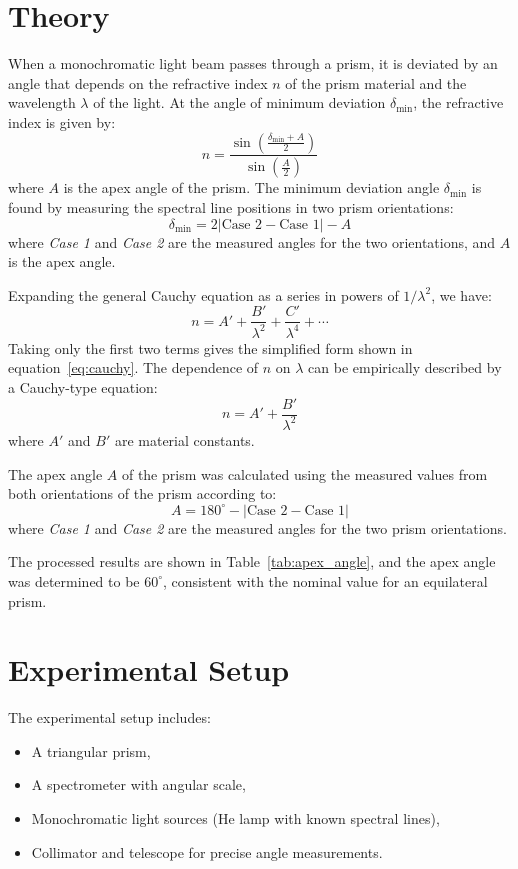 \documentclass[journal]{IEEEtran}
\begin{document}
\section*{Theory}
When a monochromatic light beam passes through a prism, it is deviated by an angle that depends on the refractive index \( n \) of the prism material and the wavelength \( \lambda \) of the light. At the angle of minimum deviation \( \delta_{\min} \), the refractive index is given by:
\begin{equation}
n = \frac{\sin\left(\frac{\delta_{\min} + A}{2}\right)}{\sin\left(\frac{A}{2}\right)}
\label{eq:refractive_index}
\end{equation}
where \( A \) is the apex angle of the prism.
The minimum deviation angle \( \delta_{\min} \) is found by measuring the spectral line positions in two prism orientations:
\begin{equation}
\delta_{\min} = 2 \left| \text{Case 2} - \text{Case 1} \right| - A
\end{equation}
where \textit{Case 1} and \textit{Case 2} are the measured angles for the two orientations, and \( A \) is the apex angle. 

Expanding the general Cauchy equation as a series in powers of \( 1/\lambda^2 \), we have:
\begin{equation}
n = A' + \frac{B'}{\lambda^2} + \frac{C'}{\lambda^4} + \cdots
\end{equation}
Taking only the first two terms gives the simplified form shown in equation~\eqref{eq:cauchy}.
The dependence of \( n \) on \( \lambda \) can be empirically described by a Cauchy-type equation:
\begin{equation}
n = A' + \frac{B'}{\lambda^2}
\label{eq:cauchy}
\end{equation}
where \( A' \) and \( B' \) are material constants.

The apex angle \( A \) of the prism was calculated using the measured values from both orientations of the prism according to:
\begin{equation}
A = 180^\circ - \left| \text{Case 2} - \text{Case 1} \right|
\end{equation}
where \textit{Case 1} and \textit{Case 2} are the measured angles for the two prism orientations. 

The processed results are shown in Table~\ref{tab:apex_angle}, and the apex angle was determined to be \( 60^\circ \), consistent with the nominal value for an equilateral prism.

\section{Experimental Setup}
The experimental setup includes:
\begin{itemize}
    \item A triangular prism,
    \item A spectrometer with angular scale,
    \item Monochromatic light sources (He lamp with known spectral lines),
    \item Collimator and telescope for precise angle measurements.
\end{itemize}
\end{document}

